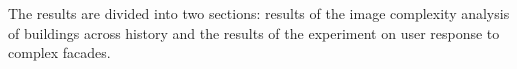 %

The results are divided into two sections: results of the image complexity analysis of buildings across history and the results of the experiment on user response to complex facades.


